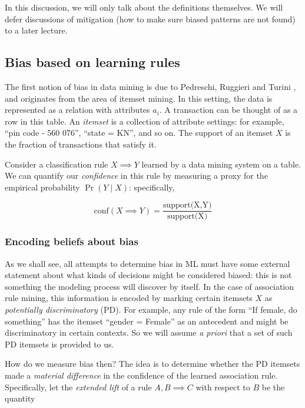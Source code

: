 \documentclass[11pt]{paper}
\begin{document}
In this discussion, we will only talk about the definitions themselves.
We will defer discussions of mitigation (how to make sure biased
patterns are not found) to a later lecture.

\subsection{Bias based on learning
rules}\label{bias-based-on-learning-rules}

The first notion of bias in data mining is due to Pedreschi, Ruggieri
and Turini \citep{pedreshi_discrimination-aware_2008}, and originates
from the area of itemset mining. In this setting, the data is
represented as a relation with attributes $a_i$. A transaction can be
thought of as a row in this table. An \emph{itemset} is a collection of
attribute settings: for example, ``pin code - 560 076'', ``state = KN'',
and so on. The support of an itemset $X$ is the fraction of transactions
that satisfy it.

Consider a classification rule $X \implies Y$ learned by a data mining
system on a table. We can quantify our \emph{confidence} in this rule by
measuring a proxy for the empirical probability $\Pr(Y \mid X)$:
specifically,

\[ \text{conf}(X \implies Y) = \frac{\text{support(X,Y)}}{\text{support(X)}} \]

\subsubsection{Encoding beliefs about
bias}\label{encoding-beliefs-about-bias}

As we shall see, all attempts to determine bias in ML must have some
external statement about what kinds of decisions might be considered
biased: this is not something the modeling process will discover by
itself. In the case of association rule mining, this information is
encoded by marking certain itemsets $X$ as \emph{potentially
discriminatory} (PD). For example, any rule of the form ``If female, do
something'' has the itemset ``gender = Female'' as an antecedent and
might be discriminatory in certain contexts. So we will assume \emph{a
priori} that a set of such PD itemsets is provided to us.

How do we measure bias then? The idea is to determine whether the PD
itemsets made a \emph{material difference} in the confidence of the
learned association rule. Specifically, let the \emph{extended lift} of
a rule $A, B \implies C$ with respect to $B$ be the quantity
\end{document}

